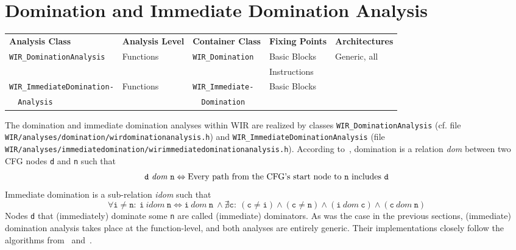 \clearpage


\section{Domination and Immediate Domination Analysis}
\label{sec:domination}

\begin{tabular}{|l|l|l|l|l|}
  \hline
  \textbf{Analysis Class} & \textbf{Analysis Level} & \textbf{Container Class} & \textbf{Fixing Points} & \textbf{Architectures} \\
  \hhline{|=|=|=|=|=|}
  \texttt{\small WIR\_DominationAnalysis} & Functions & \texttt{\small WIR\_Domination} & Basic Blocks & \multirow{4}{*}{Generic, all} \\
  & & & Instructions & \\
  \hhline{----}
  \texttt{\small WIR\_ImmediateDomination-} & Functions & \texttt{\small WIR\_Immediate-} & Basic Blocks & \\
  \texttt{\small \ \ Analysis} & & \texttt{\small \ \ Domination} & & \\
  \hline
\end{tabular}

The domination and immediate domination analyses within \gls{WIR} are realized by classes \texttt{WIR\_DominationAnaly\-sis} (cf. file \texttt{WIR/analyses/domination/wirdominationanalysis.h}) and \texttt{WIR\_ImmediateDomination\-Analysis} (file \texttt{WIR/analyses/immediatedomination/wirimmediatedominationanalysis.h}).
According to~\cite[chapter~7.3]{Much97}, domination is a relation \emph{dom} between two \gls{CFG} nodes \texttt{d} and \texttt{n} such that
\begin{equation}
  \texttt{d}\ \textit{dom}\ \texttt{n} \Leftrightarrow \text{Every path from the CFG's start node to \texttt{n} includes \texttt{d}}
\end{equation}
Immediate domination is a sub-relation \emph{idom} such that
\begin{equation}
  \forall\texttt{i} \not= \texttt{n}:\ \texttt{i}\ \textit{idom}\ \texttt{n} \Leftrightarrow \texttt{i}\ \textit{dom}\ \texttt{n}\ \wedge \nexists\texttt{c}:\ (\texttt{c} \not= \texttt{i}) \wedge (\texttt{c} \not= \texttt{n}) \wedge (\texttt{i}\ \textit{dom}\ \texttt{c}) \wedge (\texttt{c}\ \textit{dom}\ \texttt{n})
\end{equation}
Nodes \texttt{d} that (immediately) dominate some \texttt{n} are called (immediate) dominators.
As was the case in the previous sections, (immediate) domination analysis takes place at the function-level, and both analyses are entirely generic.
Their implementations closely follow the algorithms from~\cite[chapter~18.1]{Appel04} and~\cite[chapter~7.3]{Much97}.

